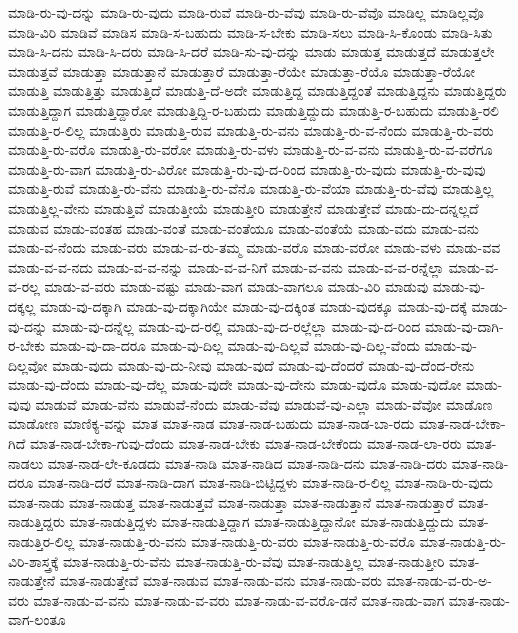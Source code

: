 {ಮಾಡಿ-ರು-ವು-ದನ್ನು
ಮಾಡಿ-ರು-ವುದು
ಮಾಡಿ-ರುವೆ
ಮಾಡಿ-ರು-ವೆವು
ಮಾಡಿ-ರು-ವೆವೊ
ಮಾಡಿಲ್ಲ
ಮಾಡಿಲ್ಲವೊ
ಮಾಡಿ-ವಿರಿ
ಮಾಡಿವೆ
ಮಾಡಿಸ
ಮಾಡಿ-ಸ-ಬಹುದು
ಮಾಡಿ-ಸ-ಬೇಕು
ಮಾಡಿ-ಸಲು
ಮಾಡಿ-ಸಿ-ಕೊಂಡು
ಮಾಡಿ-ಸಿತು
ಮಾಡಿ-ಸಿ-ದನು
ಮಾಡಿ-ಸಿ-ದರು
ಮಾಡಿ-ಸಿ-ದರೆ
ಮಾಡಿ-ಸು-ವು-ದನ್ನು
ಮಾಡು
ಮಾಡುತ್ತ
ಮಾಡುತ್ತದೆ
ಮಾಡುತ್ತಲೇ
ಮಾಡುತ್ತವೆ
ಮಾಡುತ್ತಾ
ಮಾಡುತ್ತಾನೆ
ಮಾಡುತ್ತಾರೆ
ಮಾಡುತ್ತಾ-ರೆಯೇ
ಮಾಡುತ್ತಾ-ರೆಯೊ
ಮಾಡುತ್ತಾ-ರೆಯೋ
ಮಾಡುತ್ತಿ
ಮಾಡುತ್ತಿತ್ತು
ಮಾಡುತ್ತಿದೆ
ಮಾಡುತ್ತಿ-ದೆ-ಅದೇ
ಮಾಡುತ್ತಿದ್ದ
ಮಾಡುತ್ತಿದ್ದಂತೆ
ಮಾಡುತ್ತಿದ್ದನು
ಮಾಡುತ್ತಿದ್ದರು
ಮಾಡುತ್ತಿದ್ದಾಗ
ಮಾಡುತ್ತಿದ್ದಾರೋ
ಮಾಡುತ್ತಿದ್ದಿ-ರ-ಬಹುದು
ಮಾಡುತ್ತಿದ್ದುದು
ಮಾಡುತ್ತಿ-ರ-ಬಹುದು
ಮಾಡುತ್ತಿ-ರಲಿ
ಮಾಡುತ್ತಿ-ರ-ಲಿಲ್ಲ
ಮಾಡುತ್ತಿರು
ಮಾಡುತ್ತಿ-ರುವ
ಮಾಡುತ್ತಿ-ರು-ವನು
ಮಾಡುತ್ತಿ-ರು-ವ-ನೆಂದು
ಮಾಡುತ್ತಿ-ರು-ವರು
ಮಾಡುತ್ತಿ-ರು-ವರೊ
ಮಾಡುತ್ತಿ-ರು-ವರೋ
ಮಾಡುತ್ತಿ-ರು-ವಳು
ಮಾಡುತ್ತಿ-ರು-ವ-ವನು
ಮಾಡುತ್ತಿ-ರು-ವ-ವರೆಗೂ
ಮಾಡುತ್ತಿ-ರು-ವಾಗ
ಮಾಡುತ್ತಿ-ರು-ವಿರೋ
ಮಾಡುತ್ತಿ-ರು-ವು-ದ-ರಿಂದ
ಮಾಡುತ್ತಿ-ರು-ವುದು
ಮಾಡುತ್ತಿ-ರು-ವುವು
ಮಾಡುತ್ತಿ-ರುವೆ
ಮಾಡುತ್ತಿ-ರು-ವೆನು
ಮಾಡುತ್ತಿ-ರು-ವೆನೊ
ಮಾಡುತ್ತಿ-ರು-ವೆಯಾ
ಮಾಡುತ್ತಿ-ರು-ವೆವು
ಮಾಡುತ್ತಿಲ್ಲ
ಮಾಡುತ್ತಿಲ್ಲ-ವೇನು
ಮಾಡುತ್ತಿವೆ
ಮಾಡುತ್ತೀಯೆ
ಮಾಡುತ್ತೀರಿ
ಮಾಡುತ್ತೇನೆ
ಮಾಡುತ್ತೇವೆ
ಮಾಡು-ದು-ದನ್ನಲ್ಲದೆ
ಮಾಡುವ
ಮಾಡು-ವಂತಹ
ಮಾಡು-ವಂತೆ
ಮಾಡು-ವಂತೆಯೂ
ಮಾಡು-ವಂತೆಯೆ
ಮಾಡು-ವದು
ಮಾಡು-ವನು
ಮಾಡು-ವ-ನೆಂದು
ಮಾಡು-ವರು
ಮಾಡು-ವ-ರು-ತಮ್ಮ
ಮಾಡು-ವರೊ
ಮಾಡು-ವರೋ
ಮಾಡು-ವಳು
ಮಾಡು-ವವ
ಮಾಡು-ವ-ವ-ನದು
ಮಾಡು-ವ-ವ-ನನ್ನು
ಮಾಡು-ವ-ವ-ನಿಗೆ
ಮಾಡು-ವ-ವನು
ಮಾಡು-ವ-ವ-ರನ್ನೆಲ್ಲಾ
ಮಾಡು-ವ-ವ-ರಲ್ಲ
ಮಾಡು-ವ-ವರು
ಮಾಡು-ವಷ್ಟು
ಮಾಡು-ವಾಗ
ಮಾಡು-ವಾಗಲೂ
ಮಾಡು-ವಿರಿ
ಮಾಡುವು
ಮಾಡು-ವು-ದಕ್ಕಲ್ಲ
ಮಾಡು-ವು-ದಕ್ಕಾಗಿ
ಮಾಡು-ವು-ದಕ್ಕಾಗಿಯೇ
ಮಾಡು-ವು-ದಕ್ಕಿಂತ
ಮಾಡು-ವುದಕ್ಕೂ
ಮಾಡು-ವು-ದಕ್ಕೆ
ಮಾಡು-ವು-ದನ್ನು
ಮಾಡು-ವು-ದನ್ನೆಲ್ಲ
ಮಾಡು-ವು-ದ-ರಲ್ಲಿ
ಮಾಡು-ವು-ದ-ರಲ್ಲೆಲ್ಲಾ
ಮಾಡು-ವು-ದ-ರಿಂದ
ಮಾಡು-ವು-ದಾಗಿ-ರ-ಬೇಕು
ಮಾಡು-ವು-ದಾ-ದರೂ
ಮಾಡು-ವು-ದಿಲ್ಲ
ಮಾಡು-ವು-ದಿಲ್ಲವೆ
ಮಾಡು-ವು-ದಿಲ್ಲ-ವೆಂದು
ಮಾಡು-ವು-ದಿಲ್ಲವೋ
ಮಾಡು-ವುದು
ಮಾಡು-ವು-ದು-ನೀವು
ಮಾಡು-ವುದೆ
ಮಾಡು-ವು-ದೆಂದರೆ
ಮಾಡು-ವು-ದೆಂದ-ರೇನು
ಮಾಡು-ವು-ದೆಂದು
ಮಾಡು-ವು-ದೆಲ್ಲ
ಮಾಡು-ವುದೇ
ಮಾಡು-ವು-ದೇನು
ಮಾಡು-ವುದೊ
ಮಾಡು-ವುದೋ
ಮಾಡು-ವುವು
ಮಾಡುವೆ
ಮಾಡು-ವೆನು
ಮಾಡುವೆ-ನೆಂದು
ಮಾಡು-ವೆವು
ಮಾಡುವೆ-ವು-ಎಲ್ಲಾ
ಮಾಡು-ವೆವೋ
ಮಾಡೊಣ
ಮಾಡೋಣ
ಮಾಣಿಕ್ಯ-ವನ್ನು
ಮಾತ
ಮಾತ-ನಾಡ
ಮಾತ-ನಾಡ-ಬಹುದು
ಮಾತ-ನಾಡ-ಬಾ-ರದು
ಮಾತ-ನಾಡ-ಬೇಕಾ-ಗಿದೆ
ಮಾತ-ನಾಡ-ಬೇಕಾ-ಗುವು-ದೆಂದು
ಮಾತ-ನಾಡ-ಬೇಕು
ಮಾತ-ನಾಡ-ಬೇಕೆಂದು
ಮಾತ-ನಾಡ-ಲಾ-ರರು
ಮಾತ-ನಾಡಲು
ಮಾತ-ನಾಡ-ಲೇ-ಕೂಡದು
ಮಾತ-ನಾಡಿ
ಮಾತ-ನಾಡಿದ
ಮಾತ-ನಾಡಿ-ದನು
ಮಾತ-ನಾಡಿ-ದರು
ಮಾತ-ನಾಡಿ-ದರೂ
ಮಾತ-ನಾಡಿ-ದರೆ
ಮಾತ-ನಾಡಿ-ದಾಗ
ಮಾತ-ನಾಡಿ-ಬಿಟ್ಟಿದ್ದಳು
ಮಾತ-ನಾಡಿ-ರ-ಲಿಲ್ಲ
ಮಾತ-ನಾಡಿ-ರು-ವುದು
ಮಾತ-ನಾಡು
ಮಾತ-ನಾಡುತ್ತ
ಮಾತ-ನಾಡುತ್ತವೆ
ಮಾತ-ನಾಡುತ್ತಾ
ಮಾತ-ನಾಡುತ್ತಾನೆ
ಮಾತ-ನಾಡುತ್ತಾರೆ
ಮಾತ-ನಾಡುತ್ತಿದ್ದರು
ಮಾತ-ನಾಡುತ್ತಿದ್ದಳು
ಮಾತ-ನಾಡುತ್ತಿದ್ದಾಗ
ಮಾತ-ನಾಡುತ್ತಿದ್ದಾನೋ
ಮಾತ-ನಾಡುತ್ತಿದ್ದುದು
ಮಾತ-ನಾಡುತ್ತಿರ-ಲಿಲ್ಲ
ಮಾತ-ನಾಡುತ್ತಿ-ರು-ವನು
ಮಾತ-ನಾಡುತ್ತಿ-ರು-ವರು
ಮಾತ-ನಾಡುತ್ತಿ-ರು-ವರೊ
ಮಾತ-ನಾಡುತ್ತಿ-ರು-ವಿರಿ-ಶಾಸ್ತ್ರಕ್ಕೆ
ಮಾತ-ನಾಡುತ್ತಿ-ರು-ವೆನು
ಮಾತ-ನಾಡುತ್ತಿ-ರು-ವೆವು
ಮಾತ-ನಾಡುತ್ತಿಲ್ಲ
ಮಾತ-ನಾಡುತ್ತೀರಿ
ಮಾತ-ನಾಡುತ್ತೇನೆ
ಮಾತ-ನಾಡುತ್ತೇವೆ
ಮಾತ-ನಾಡುವ
ಮಾತ-ನಾಡು-ವನು
ಮಾತ-ನಾಡು-ವರು
ಮಾತ-ನಾಡು-ವ-ರು-ಅ-ವರು
ಮಾತ-ನಾಡು-ವ-ವನು
ಮಾತ-ನಾಡು-ವ-ವರು
ಮಾತ-ನಾಡು-ವ-ವರೊ-ಡನೆ
ಮಾತ-ನಾಡು-ವಾಗ
ಮಾತ-ನಾಡು-ವಾಗ-ಲಂತೂ
}
